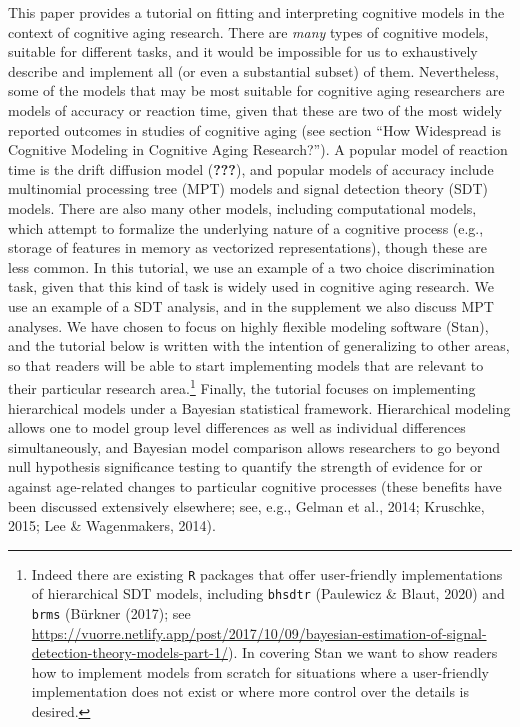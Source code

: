 \documentclass[
  english,
  ,man,floatsintext]{apa6}
\begin{document}
This paper provides a tutorial on fitting and interpreting cognitive models in the context of cognitive aging research. There are \emph{many} types of cognitive models, suitable for different tasks, and it would be impossible for us to exhaustively describe and implement all (or even a substantial subset) of them. Nevertheless, some of the models that may be most suitable for cognitive aging researchers are models of accuracy or reaction time, given that these are two of the most widely reported outcomes in studies of cognitive aging (see section \enquote{How Widespread is Cognitive Modeling in Cognitive Aging Research?}). A popular model of reaction time is the drift diffusion model ({\textbf{???}}), and popular models of accuracy include multinomial processing tree (MPT) models and signal detection theory (SDT) models. There are also many other models, including computational models, which attempt to formalize the underlying nature of a cognitive process (e.g., storage of features in memory as vectorized representations), though these are less common. In this tutorial, we use an example of a two choice discrimination task, given that this kind of task is widely used in cognitive aging research. We use an example of a SDT analysis, and in the supplement we also discuss MPT analyses. We have chosen to focus on highly flexible modeling software (Stan), and the tutorial below is written with the intention of generalizing to other areas, so that readers will be able to start implementing models that are relevant to their particular research area.\footnote{Indeed there are existing \texttt{R} packages that offer user-friendly implementations of hierarchical SDT models, including \texttt{bhsdtr} (Paulewicz \& Blaut, 2020) and \texttt{brms} (Bürkner (2017); see \url{https://vuorre.netlify.app/post/2017/10/09/bayesian-estimation-of-signal-detection-theory-models-part-1/}). In covering Stan we want to show readers how to implement models from scratch for situations where a user-friendly implementation does not exist or where more control over the details is desired.} Finally, the tutorial focuses on implementing hierarchical models under a Bayesian statistical framework. Hierarchical modeling allows one to model group level differences as well as individual differences simultaneously, and Bayesian model comparison allows researchers to go beyond null hypothesis significance testing to quantify the strength of evidence for or against age-related changes to particular cognitive processes (these benefits have been discussed extensively elsewhere; see, e.g., Gelman et al., 2014; Kruschke, 2015; Lee \& Wagenmakers, 2014).
\end{document}
